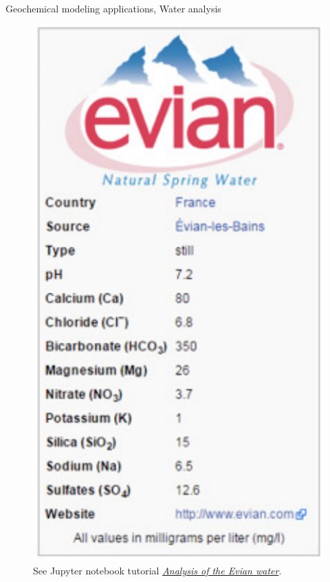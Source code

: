 \begin{frame}{Geochemical modeling applications, Water analysis}
\begin{figure}
\includegraphics[height=0.6\textheight]{figures/applications/evian-chemical-water-composition}
\caption*{See Jupyter notebook tutorial \href{https://github.com/mtsveta/reaktoro-v2-workshop/blob/main/tutorials/applications/evian-water-analysis.ipynb}{\textcolor{indigo(dye)}{\it Analysis of the Evian water}}.}
\end{figure}
%
\ecol
%
\end{frame}

